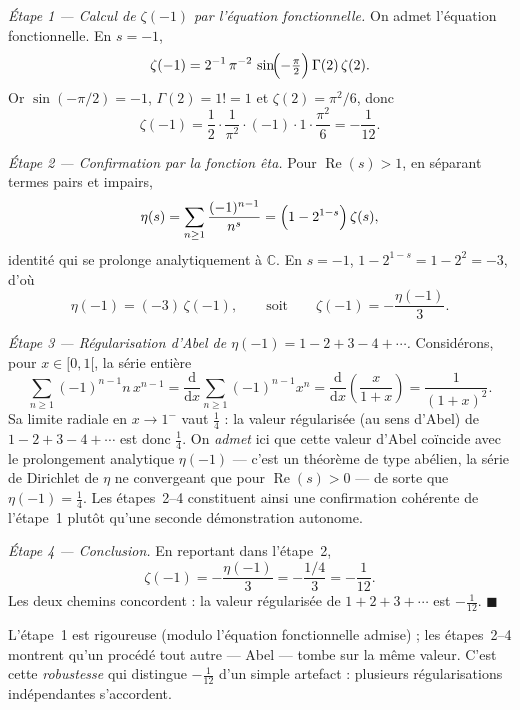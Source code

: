 \begin{mdframed}[style=proofbar]
  \textit{Étape 1 — Calcul de $\zeta(-1)$ par l'équation fonctionnelle.}
  On admet l'équation fonctionnelle. En $s=-1$,
  \[
    \zeta(-1)=2^{-1}\,\pi^{-2}\,\sin\!\Bigl(-\tfrac{\pi}{2}\Bigr)\,
      \Gamma(2)\,\zeta(2).
  \]
  Or $\sin(-\pi/2)=-1$, $\Gamma(2)=1!=1$ et $\zeta(2)=\pi^2/6$, donc
  \[
    \zeta(-1)=\frac{1}{2}\cdot\frac{1}{\pi^{2}}\cdot(-1)\cdot 1\cdot
      \frac{\pi^{2}}{6}
    =-\frac{1}{12}.
  \]

  \medskip
  \textit{Étape 2 — Confirmation par la fonction êta.}
  Pour $\operatorname{Re}(s)>1$, en séparant termes pairs et impairs,
  \[
    \eta(s)=\sum_{n\geq 1}\frac{(-1)^{n-1}}{n^{s}}
    =\Bigl(1-2^{1-s}\Bigr)\,\zeta(s),
  \]
  identité qui se prolonge analytiquement à $\mathbb{C}$. En $s=-1$,
  $1-2^{1-s}=1-2^{2}=-3$, d'où
  \[
    \eta(-1)=(-3)\,\zeta(-1),\qquad\text{soit}\qquad
    \zeta(-1)=-\frac{\eta(-1)}{3}.
  \]

  \medskip
  \textit{Étape 3 — Régularisation d'Abel de $\eta(-1)=1-2+3-4+\cdots$.}
  Considérons, pour $x\in[0,1[$, la série entière
  \[
    \sum_{n\geq 1}(-1)^{n-1}n\,x^{n-1}
    =\frac{\mathrm{d}}{\mathrm{d}x}\sum_{n\geq 1}(-1)^{n-1}x^{n}
    =\frac{\mathrm{d}}{\mathrm{d}x}\!\left(\frac{x}{1+x}\right)
    =\frac{1}{(1+x)^{2}}.
  \]
  Sa limite radiale en $x\to 1^{-}$ vaut $\tfrac14$ : la valeur régularisée
  (au sens d'Abel) de $1-2+3-4+\cdots$ est donc $\tfrac14$. On \emph{admet}
  ici que cette valeur d'Abel coïncide avec le prolongement analytique
  $\eta(-1)$ — c'est un théorème de type abélien, la série de Dirichlet de
  $\eta$ ne convergeant que pour $\operatorname{Re}(s)>0$ — de sorte que
  $\eta(-1)=\tfrac14$. Les étapes~2--4 constituent ainsi une confirmation
  cohérente de l'étape~1 plutôt qu'une seconde démonstration autonome.

  \medskip
  \textit{Étape 4 — Conclusion.}
  En reportant dans l'étape~2,
  \[
    \zeta(-1)=-\frac{\eta(-1)}{3}=-\frac{1/4}{3}=-\frac{1}{12}.
  \]
  Les deux chemins concordent : la valeur régularisée de $1+2+3+\cdots$ est
  $-\tfrac1{12}$.
  \hfill$\blacksquare$
\end{mdframed}

\begin{significationintuitive}
L'étape~1 est rigoureuse (modulo l'équation fonctionnelle admise) ; les
étapes~2--4 montrent qu'un procédé tout autre — Abel — tombe sur la même valeur.
C'est cette \emph{robustesse} qui distingue $-\tfrac1{12}$ d'un simple artefact :
plusieurs régularisations indépendantes s'accordent.
\end{significationintuitive}

